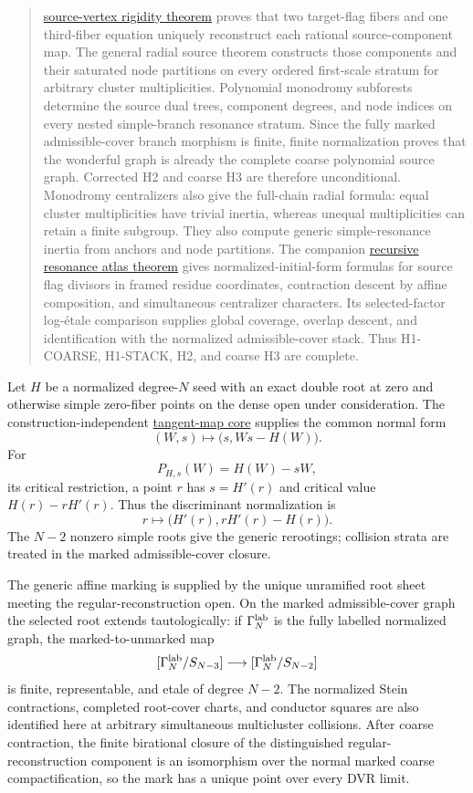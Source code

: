 \documentclass[11pt]{article}
\begin{document}
\begin{quote}
\href{../../extended-geometry/SOURCE_VERTEX_RIGIDITY.md}{source-vertex
rigidity theorem} proves that two target-flag fibers and one third-fiber
equation uniquely reconstruct each rational source-component map.  The
general radial source theorem constructs those components and their
saturated node partitions on every ordered first-scale stratum for arbitrary
cluster multiplicities.  Polynomial monodromy subforests determine the
source dual trees, component degrees, and node indices on every nested
simple-branch resonance stratum.  Since the fully marked admissible-cover
branch morphism is finite, finite normalization proves that the wonderful
graph is already the complete coarse polynomial source graph.  Corrected H2
and coarse H3 are therefore unconditional.  Monodromy centralizers also
give the full-chain radial formula: equal cluster multiplicities have
trivial inertia, whereas unequal multiplicities can retain a finite
subgroup.  They also compute generic simple-resonance inertia from anchors
and node partitions.  The companion
\href{../../extended-geometry/RECURSIVE_RESONANCE_ATLAS.md}{recursive
resonance atlas theorem} gives normalized-initial-form formulas for source
flag divisors in framed residue coordinates, contraction descent by affine
composition, and simultaneous centralizer characters.  Its selected-factor
log-\'etale comparison supplies global coverage, overlap descent, and
identification with the normalized admissible-cover stack.  Thus
H1-COARSE, H1-STACK, H2, and coarse H3 are complete.
\end{quote}

Let $H$ be a normalized degree-$N$ seed with an exact double root at zero and
otherwise simple zero-fiber points on the dense open under consideration.
The construction-independent
\href{../../verified/TANGENT_MAP_CORE.md}{tangent-map core} supplies the
common normal form
\[
 (W,s)\longmapsto\bigl(s,Ws-H(W)\bigr).
\]
For
\[
 P_{H,s}(W)=H(W)-sW,
\]
its critical restriction, a point $r$ has $s=H'(r)$ and critical value
$H(r)-rH'(r)$.  Thus the discriminant normalization is
\[
 r\longmapsto \bigl(H'(r),rH'(r)-H(r)\bigr).
\]
The $N-2$ nonzero simple roots give the generic rerootings; collision strata
are treated in the marked admissible-cover closure.

The generic affine marking is supplied by the unique unramified root sheet
meeting the regular-reconstruction open.  On the marked admissible-cover
graph the selected root extends tautologically: if
$\Gamma_N^{\rm lab}$ is the fully labelled normalized graph, the
marked-to-unmarked map
\[
 [\Gamma_N^{\rm lab}/S_{N-3}]
 \longrightarrow
 [\Gamma_N^{\rm lab}/S_{N-2}]
\]
is finite, representable, and etale of degree $N-2$.  The normalized Stein
contractions, completed root-cover charts, and conductor squares are also
identified here at arbitrary simultaneous multicluster collisions.  After
coarse contraction, the finite birational closure of the distinguished
regular-reconstruction component is an isomorphism over the normal marked
coarse compactification, so the mark has a unique point over every DVR limit.
\end{document}
